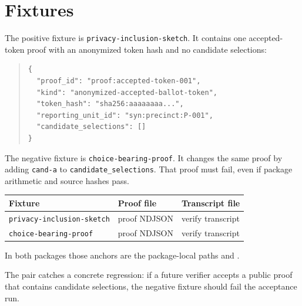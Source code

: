 \section{Fixtures}

The positive fixture is \texttt{privacy-inclusion-sketch}. It contains one
accepted-token proof with an anonymized token hash and no candidate selections:
\begin{quote}
\footnotesize
\begin{verbatim}
{
  "proof_id": "proof:accepted-token-001",
  "kind": "anonymized-accepted-ballot-token",
  "token_hash": "sha256:aaaaaaaa...",
  "reporting_unit_id": "syn:precinct:P-001",
  "candidate_selections": []
}
\end{verbatim}
\end{quote}

The negative fixture is \texttt{choice-bearing-proof}. It changes the same proof
by adding \texttt{cand-a} to \texttt{candidate\_selections}. That proof must
fail, even if package arithmetic and source hashes pass.

\begin{center}
\small
\begin{tabularx}{\textwidth}{lXX}
\toprule
Fixture & Proof file & Transcript file \\
\midrule
\texttt{privacy-inclusion-sketch} & proof NDJSON & verify transcript \\
\texttt{choice-bearing-proof} & proof NDJSON & verify transcript \\
\bottomrule
\end{tabularx}
\end{center}

In both packages those anchors are the package-local paths
 and
.

The pair catches a concrete regression: if a future verifier accepts a public
proof that contains candidate selections, the negative fixture should fail the
acceptance run.
